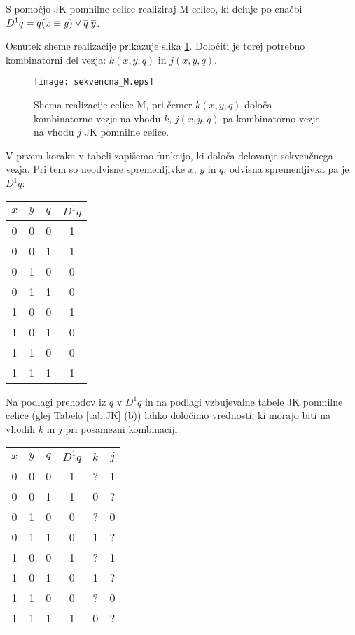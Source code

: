 \begin{zgled}
S pomočjo JK pomnilne celice realiziraj M celico, ki deluje po enačbi $D^1 q = q(x \equiv y) \vee \overline q \; \overline y$.
\end{zgled}
\begin{resitev}
Osnutek sheme realizacije prikazuje slika \ref{fig:celica_M}. Določiti je torej potrebno kombinatorni del vezja: $k(x,y,q)$  in $j(x,y,q)$.\\

\begin{figure}[ht]
\centering
\texttt{[image: sekvencna\_M.eps]}
\caption{Shema realizacije celice M, pri čemer $k(x,y,q)$ določa kombinatorno vezje na vhodu $k$, $j(x,y,q)$ pa kombinatorno vezje na vhodu $j$ JK pomnilne celice.}
\label{fig:celica_M}
\end{figure}

\bigskip

V prvem koraku v tabeli zapišemo funkcijo, ki določa delovanje sekvenčnega vezja. Pri tem so neodvisne spremenljivke $x$, $y$ in $q$, odvisna spremenljivka pa je $D^1 q$:

\begin{center}
\begin{tabular}{ccc|c}
$x$ & $y$ & $q$ & $D^1 q$ \\
\hline
0 & 0 & 0 & 1 \\
0 & 0 & 1 & 1 \\
0 & 1 & 0 & 0 \\
0 & 1 & 1 & 0 \\
1 & 0 & 0 & 1 \\
1 & 0 & 1 & 0 \\
1 & 1 & 0 & 0 \\
1 & 1 & 1 & 1 
\end{tabular}
\end{center}


Na podlagi prehodov iz $q$ v $D^1 q$ in na podlagi vzbujevalne tabele JK pomnilne celice (glej Tabelo \ref{tab:JK} (b)) lahko določimo vrednosti, ki morajo biti na vhodih $k$ in $j$ pri posamezni kombinaciji:

\begin{center}
\begin{tabular}{ccc|c|cc}
$x$ & $y$ & $q$ & $D^1 q$ &$k$ & $j$\\
\hline
0 & 0 & 0 & 1 & ? & 1\\
0 & 0 & 1 & 1 & 0 & ?\\
0 & 1 & 0 & 0 & ? & 0\\
0 & 1 & 1 & 0 & 1 & ?\\
1 & 0 & 0 & 1 & ? & 1\\
1 & 0 & 1 & 0 & 1 & ?\\
1 & 1 & 0 & 0 & ? & 0\\
1 & 1 & 1 & 1 & 0 & ?
\end{tabular}
\end{center}



\end{resitev}
